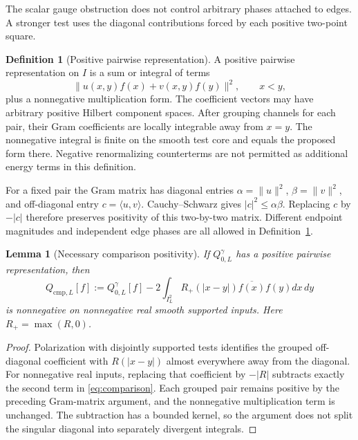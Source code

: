\documentclass[11pt]{article}
\numberwithin{equation}{section}
\newtheorem{lemma}[theorem]{Lemma}
\theoremstyle{definition}
\newtheorem{definition}[theorem]{Definition}
\theoremstyle{remark}
\newcommand{\norm}[1]{\lVert#1\rVert}
\newcommand{\ip}[2]{\langle#1,#2\rangle}
\newcommand{\Qgam}{Q^{\gamma}}
\begin{document}
The scalar gauge obstruction does not control arbitrary phases attached
to edges. A stronger test uses the diagonal contributions forced by each
positive two-point square.

\begin{definition}[Positive pairwise representation]\label{def:pair}
A positive pairwise representation on $I$ is a sum or integral of terms
\begin{equation}
\norm{u(x,y)f(x)+v(x,y)f(y)}^2,
\qquad x<y,
\label{eq:pairrow}
\end{equation}
plus a nonnegative multiplication form. The coefficient vectors may have
arbitrary positive Hilbert component spaces. After grouping channels for
each pair, their Gram coefficients are locally integrable away from
$x=y$. The nonnegative integral is finite on the smooth test core and
equals the proposed form there. Negative renormalizing counterterms are
not permitted as additional energy terms in this definition.
\end{definition}

For a fixed pair the Gram matrix has diagonal entries
$\alpha=\norm u^2$, $\beta=\norm v^2$, and off-diagonal entry
$c=\ip uv$. Cauchy--Schwarz gives $|c|^2\leq\alpha\beta$.
Replacing $c$ by $-|c|$ therefore preserves positivity of this
two-by-two matrix. Different endpoint magnitudes and independent edge
phases are all allowed in Definition~\ref{def:pair}.

\begin{lemma}[Necessary comparison positivity]\label{lem:comparison}
If $\Qgam_{0,L}$ has a positive pairwise representation, then
\begin{equation}
Q_{\mathrm{cmp},L}[f]:=\Qgam_{0,L}[f]
-2\int_{I_L^2}R_+(|x-y|)\overline{f(x)}f(y)dx\,dy
\label{eq:comparison}
\end{equation}
is nonnegative on nonnegative real smooth supported inputs. Here
$R_+=\max(R,0)$.
\end{lemma}
\begin{proof}
Polarization with disjointly supported tests identifies the grouped
off-diagonal coefficient with $R(|x-y|)$ almost everywhere away from
the diagonal. For nonnegative real inputs, replacing that coefficient by
$-|R|$ subtracts exactly the second term in \eqref{eq:comparison}.
Each grouped pair remains positive by the preceding Gram-matrix argument,
and the nonnegative multiplication term is unchanged. The subtraction
has a bounded kernel, so the argument does not split the singular
diagonal into separately divergent integrals.
\end{proof}
\end{document}
